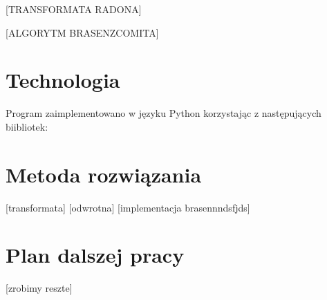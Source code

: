 \documentclass[A_4paper,12pt]{article}
\begin{document}
[TRANSFORMATA RADONA]

[ALGORYTM BRASENZCOMITA]

\section{Technologia}
Program zaimplementowano w języku Python korzystając z następujących biibliotek:
\begin{itemize}

\end{itemize}

\section{Metoda rozwiązania}
[transformata]
[odwrotna]
[implementacja brasennndsfjds]

\section{Plan dalszej pracy}
[zrobimy reszte]




\end{document}
